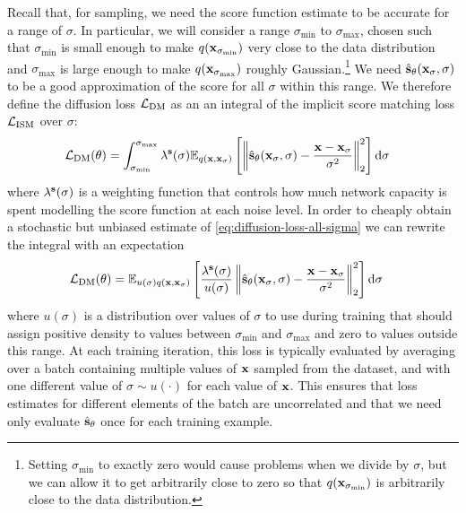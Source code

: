 Recall that, for sampling, we need the score function estimate to be accurate for a range of $\sigma$. In particular, we will consider a range $\sigma_\text{min}$ to $\sigma_\text{max}$, chosen such that $\sigma_\text{min}$ is small enough to make $q({\mathbf{x}}_{\sigma_\text{min}})$ very close to the data distribution and $\sigma_\text{max}$ is large enough to make $q({\mathbf{x}}_{\sigma_\text{max}})$ roughly Gaussian.\footnote{Setting $\sigma_\text{min}$ to exactly zero would cause problems when we divide by $\sigma$, but we can allow it to get arbitrarily close to zero so that $q({\mathbf{x}}_{\sigma_\text{min}})$ is arbitrarily close to the data distribution.} We need $\hat{{\mathbf{s}}}_\theta({\mathbf{x}}_\sigma, \sigma)$ to be a good approximation of the score for all $\sigma$ within this range. We therefore define the diffusion loss ${\mathcal{L}}_\text{DM}$ as an an integral of the implicit score matching loss ${\mathcal{L}}_\text{ISM}$ over $\sigma$:
\begin{align} \label{eq:diffusion-loss-all-sigma}
    {\mathcal{L}}_\text{DM}(\theta) &= \int_{\sigma_\text{min}}^{\sigma_\text{max}} \lambda^{\mathbf{s}}(\sigma) \mathbb{E}_{q({\mathbf{x}}, {\mathbf{x}}_\sigma)} \left[ 
    \left\| \hat{{\mathbf{s}}}_\theta({\mathbf{x}}_\sigma, \sigma) - \frac{{\mathbf{x}}-{\mathbf{x}}_\sigma}{\sigma^2} \right\|_2^2 \right] \mathrm{d}\sigma
\end{align}
where $\lambda^{\mathbf{s}}(\sigma)$ is a weighting function that controls how much network capacity is spent modelling the score function at each noise level. In order to cheaply obtain a stochastic but unbiased estimate of \cref{eq:diffusion-loss-all-sigma} we can rewrite the integral with an expectation
\begin{align} \label{eq:exp-diffusion-loss-all-sigma}
    {\mathcal{L}}_\text{DM}(\theta) &= \mathbb{E}_{u(\sigma)q({\mathbf{x}}, {\mathbf{x}}_\sigma)} \left[ \frac{\lambda^{\mathbf{s}}(\sigma)}{u(\sigma)} 
    \left\| \hat{{\mathbf{s}}}_\theta({\mathbf{x}}_\sigma, \sigma) - \frac{{\mathbf{x}}-{\mathbf{x}}_\sigma}{\sigma^2} \right\|_2^2 \right] \mathrm{d}\sigma
\end{align}
where $u(\sigma)$ is a distribution over values of $\sigma$ to use during training that should assign positive density to values between $\sigma_\text{min}$ and $\sigma_\text{max}$ and zero to values outside this range. At each training iteration, this loss is typically evaluated by averaging over a batch containing multiple values of ${\mathbf{x}}$ sampled from the dataset, and with one different value of $\sigma \sim u(\cdot)$ for each value of ${\mathbf{x}}$. This ensures that loss estimates for different elements of the batch are uncorrelated and that we need only evaluate $\hat{{\mathbf{s}}}_\theta$ once for each training example.


